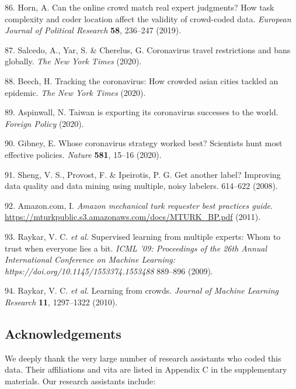 \documentclass[]{article}
\begin{document}
\leavevmode\hypertarget{ref-Horn2019}{}%
86. Horn, A. Can the online crowd match real expert judgments? How task complexity and coder location affect the validity of crowd-coded data. \emph{European Journal of Political Research} \textbf{58}, 236--247 (2019).

\leavevmode\hypertarget{ref-salcedo2020}{}%
87. Salcedo, A., Yar, S. \& Cherelus, G. Coronavirus travel restrictions and bans globally. \emph{The New York Times} (2020).

\leavevmode\hypertarget{ref-beech2020}{}%
88. Beech, H. Tracking the coronavirus: How crowded asian cities tackled an epidemic. \emph{The New York Times} (2020).

\leavevmode\hypertarget{ref-aspinwall2020}{}%
89. Aspinwall, N. Taiwan is exporting its coronavirus successes to the world. \emph{Foreign Policy} (2020).

\leavevmode\hypertarget{ref-gibney2020}{}%
90. Gibney, E. Whose coronavirus strategy worked best? Scientists hunt most effective policies. \emph{Nature} \textbf{581}, 15--16 (2020).

\leavevmode\hypertarget{ref-Sheng2008}{}%
91. Sheng, V. S., Provost, F. \& Ipeirotis, P. G. Get another label? Improving data quality and data mining using multiple, noisy labelers. 614--622 (2008).

\leavevmode\hypertarget{ref-MTurk2011}{}%
92. Amazon.com, I. \emph{Amazon mechanical turk requester best practices guide}. \url{https://mturkpublic.s3.amazonaws.com/docs/MTURK_BP.pdf} (2011).

\leavevmode\hypertarget{ref-Raykar2009}{}%
93. Raykar, V. C. \emph{et al.} Supervised learning from multiple experts: Whom to trust when everyone lies a bit. \emph{ICML '09: Proceedings of the 26th Annual International Conference on Machine Learning: https://doi.org/10.1145/1553374.1553488} 889--896 (2009).

\leavevmode\hypertarget{ref-Raykar2010}{}%
94. Raykar, V. C. \emph{et al.} Learning from crowds. \emph{Journal of Machine Learning Research} \textbf{11}, 1297--1322 (2010).

\newpage

\hypertarget{acknowledgements}{%
\subsection*{Acknowledgements}\label{acknowledgements}}

We deeply thank the very large number of research assistants who coded this data. Their affiliations and vita are listed in Appendix C in the supplementary materials. Our research assistants include:
\end{document}
